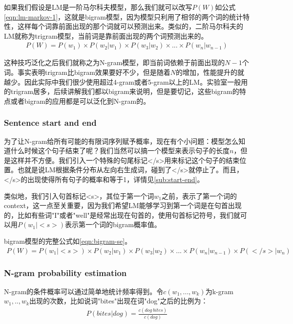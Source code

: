 如果我们假设是LM是一阶马尔科夫模型，那么我们就可以改写$P(W)$如公式\ref{eqn:lm-markov-1}，这就是bigram模型，因为模型只利用了相邻的两个词的统计特性，这样每个词靠前面出现的那个词就可以预测出来。类似的，二阶马尔科夫的LM就称为trigram模型，当前词是靠前面出现的两个词预测出来的。
\begin{align}
\label{eqn:lm-markov-1}
P(W) = P(w_1)\times{P(w_2|w_1)}\times{P(w_3|w_{2})}\times...\times{P(w_n|w_{n-1})} 
\end{align}

这种技巧泛化之后我们就称之为N-gram模型，即当前词依赖于前面出现的$N-1$个词。事实表明trigram比bigram效果要好不少，但是随着$N$的增加，性能提升的就越少。因此实际中我们很少使用超过4-gram或者5-gram以上的LM。实验室一般用的trigram居多，后续讲解我们都以bigram来说明，但是要切记，这些bigram的特点或者bigram的应用都是可以泛化到N-gram的。

\subsubsection{Sentence start and end}
为了让N-gram给所有可能的有限词序列赋予概率，现在有个小问题：模型怎么知道什么时候这个句子结束了呢？我们当然可以搞一个模型来表示句子的长度$n$，但是这样并不方便。我们引入一个特殊的句尾标记</s>用来标记这个句子的结束位置。也就是说LM根据条件分布从左向右生成词，碰到了</s>就停止了。而且，</s>的出现使得所有句子的概率和等于1，详情见\ref{sub:start-end}。

类似地，我们引入句首标记<s>，其位于第一个词$w_1$之前，表示了第一个词的context，这一点至关重要，因为我们希望LM能够学习到第一个词是在句首出现的，比如有些词"I"或者"well"是经常出现在句首的，使用句首标记符号，我们就可以用$P(w_1|<s>)$表示第一个词的bigram概率值。

bigram模型的完整公式如\ref{eqn:bigram-se}。
\begin{align}
\label{eqn:bigram-se}
P(W) = P(w_1|<s>)\times{P(w_2|w_1)}\times{P(w_3|w_{2})}\times...\times{P(w_n|w_{n-1})}\times{P(</s>|w_n)}
\end{align}

\subsubsection{N-gram probability estimation}
N-gram的条件概率可以通过简单地统计频率得到。令$c(w_1,...,w_k)$为k-gram $w_1,..,w_k$出现的次数，比如说词"bites"出现在词"dog"之后的比例为：
\begin{align}\nonumber
P(bites|dog) = \frac{c(dog\ bites)}{c(dog)}
\end{align}


